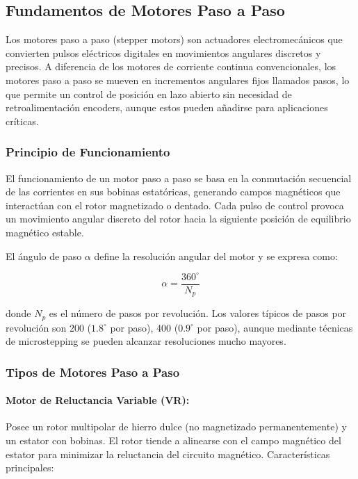 \subsection{Fundamentos de Motores Paso a Paso}

Los motores paso a paso (stepper motors) son actuadores electromecánicos que convierten pulsos eléctricos digitales en movimientos angulares discretos y precisos. A diferencia de los motores de corriente continua convencionales, los motores paso a paso se mueven en incrementos angulares fijos llamados pasos, lo que permite un control de posición en lazo abierto sin necesidad de retroalimentación encoders, aunque estos pueden añadirse para aplicaciones críticas.

\subsubsection{Principio de Funcionamiento}

El funcionamiento de un motor paso a paso se basa en la conmutación secuencial de las corrientes en sus bobinas estatóricas, generando campos magnéticos que interactúan con el rotor magnetizado o dentado. Cada pulso de control provoca un movimiento angular discreto del rotor hacia la siguiente posición de equilibrio magnético estable.

El ángulo de paso $\alpha$ define la resolución angular del motor y se expresa como:

\begin{equation}
\alpha = \frac{360^\circ}{N_p}
\end{equation}

donde $N_p$ es el número de pasos por revolución. Los valores típicos de pasos por revolución son 200 ($1.8^\circ$ por paso), 400 ($0.9^\circ$ por paso), aunque mediante técnicas de microstepping se pueden alcanzar resoluciones mucho mayores.

\subsubsection{Tipos de Motores Paso a Paso}

\paragraph{Motor de Reluctancia Variable (VR):}

Posee un rotor multipolar de hierro dulce (no magnetizado permanentemente) y un estator con bobinas. El rotor tiende a alinearse con el campo magnético del estator para minimizar la reluctancia del circuito magnético. Características principales:


